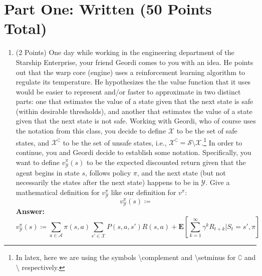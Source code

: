 \documentclass[]{article}
\begin{document}
\section*{Part One: Written (50 Points Total)}
\begin{enumerate}
    \item (2 Points) One day while working in the engineering department of the Starship Enterprise, your friend Geordi comes to you with an idea. He points out that the warp core (engine) uses a reinforcement learning algorithm to regulate its temperature. He hypothesizes the the value function that it uses would be easier to represent and/or faster to approximate in two distinct parts: one that estimates the value of a state given that the next state is safe (within desirable thresholds), and another that estimates the value of a state given that the next state is not safe. Working with Geordi, who of course uses the notation from this class, you decide to define $\mathcal X$ to be the set of safe states, and $\mathcal X^\complement$ to be the set of unsafe states, i.e., $\mathcal X^\complement = \mathcal S \setminus \mathcal X$.\footnote{In latex, here we are using the symbols \textbackslash complement and \textbackslash setminus for $\complement$ and $\setminus$ respectively.} 
    In order to continue, you and Geordi decide to establish some notation. Specifically, you want to define $v^\pi_\mathcal Y(s)$ to be the expected discounted return given that the agent begins in state $s$, follows policy $\pi$, and the next state (but not necessarily the states after the next state) happens to be in $\mathcal Y$. Give a mathematical definition for $v^\pi_\mathcal Y$ like our definition for $v^\pi$:
    \begin{equation}
        v^\pi_\mathcal Y(s)\coloneqq 
    \end{equation}
    \textbf{Answer:}\\
    \begin{equation}
        v^\pi_\mathcal Y(s)\coloneqq \sum_{a \in \mathcal A}\pi(s,a)\sum_{s'\in\mathcal X}P(s,a,s')R(s,a)+\mathbf{E}[\sum_{k=1}^{\infty}\gamma^{k}R_{t+k}|S_t=s',\pi]
    \end{equation}



\end{enumerate}
\end{document}
